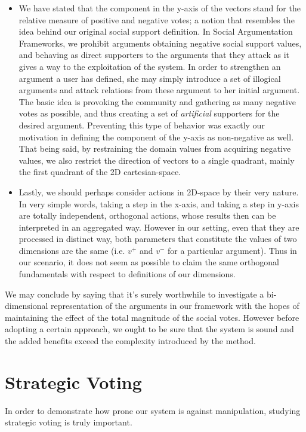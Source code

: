 \documentclass{article}
\begin{document}
{\begin{itemize}
\item We have stated that the component in the y-axis of the vectors stand for the relative measure of positive and negative votes; a notion that resembles the idea behind our original social support definition. In Social Argumentation Frameworks, we prohibit arguments obtaining negative social support values, and behaving as direct supporters to the arguments that they attack as it gives a way to the exploitation of the system. In order to strengthen an argument a user has defined, she may simply introduce a set of illogical arguments and attack relations from these argument to her initial argument. The basic idea is provoking the community and gathering as many negative votes as possible, and thus creating a set of \textit{artificial} supporters for the desired argument. Preventing this type of behavior was exactly our motivation in defining the component of the y-axis as non-negative as well. That being said, by restraining the domain values from acquiring negative values, we also restrict the direction of vectors to a single quadrant, mainly the first quadrant of the 2D cartesian-space.

\item Lastly, we should perhaps consider actions in 2D-space by their very nature. In very simple words, taking a step in the x-axis, and taking a step in y-axis are totally independent, orthogonal actions, whose results then can be interpreted in an aggregated way. However in our setting, even that they are processed in distinct way, both parameters that constitute the values of two dimensions are the same (i.e. $v^{+}$ and $v^{-}$ for a particular argument). Thus in our scenario, it does not seem as possible to claim the same orthogonal fundamentals with respect to definitions of our dimensions. 

\end{itemize}

We may conclude by saying that it's surely worthwhile to investigate a bi-dimensional representation of the arguments in our framework with the hopes of maintaining the effect of the total magnitude of the social votes. However before adopting a certain approach, we ought to be sure that the system is sound and the added benefits exceed the complexity introduced by the method.
}
 
\section{Strategic Voting}
In order to demonstrate how prone our system is against manipulation, studying strategic voting is truly important.
\end{document}
